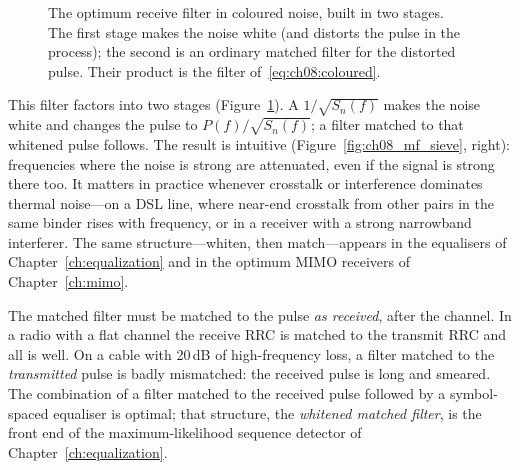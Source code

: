 \begin{figure}[htbp]\centering
{}
\caption{The optimum receive filter in coloured noise, built in two stages. The first stage makes
the noise white (and distorts the pulse in the process); the second is an ordinary matched
filter for the distorted pulse. Their product is the filter of~\eqref{eq:ch08:coloured}.}
\label{fig:ch08_whiten}
\end{figure}
This filter factors into two stages (Figure~\ref{fig:ch08_whiten}). A  $1/\sqrt{S_n(f)}$ makes the noise
white and changes the pulse to $P(f)/\sqrt{S_n(f)}$; a filter matched to that whitened pulse
follows. The result is intuitive (Figure~\ref{fig:ch08_mf_sieve}, right): frequencies where the
noise is strong are attenuated, even if the signal is strong there too. It matters in practice
whenever crosstalk or interference dominates thermal noise---on a DSL line, where near-end
crosstalk from other pairs in the same binder rises with frequency, or in a receiver with a
strong narrowband interferer. The same structure---whiten, then match---appears in the
equalisers of Chapter~\ref{ch:equalization} and in the optimum MIMO receivers of
Chapter~\ref{ch:mimo}.

\begin{pitfall}
The matched filter must be matched to the pulse \emph{as received}, after the channel. In a
radio with a flat channel the receive RRC is matched to the transmit RRC and all is well. On a
cable with 20\,dB of high-frequency loss, a filter matched to the \emph{transmitted} pulse is
badly mismatched: the received pulse is long and smeared. The combination of a filter matched
to the received pulse followed by a symbol-spaced equaliser is optimal; that structure, the
\emph{whitened matched filter}, is the front end of the maximum-likelihood sequence detector of
Chapter~\ref{ch:equalization}.
\end{pitfall}

